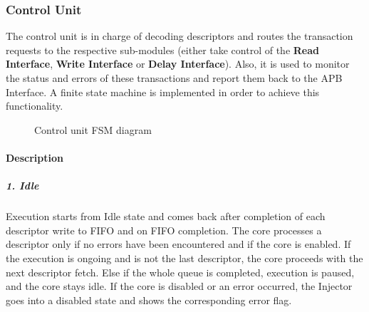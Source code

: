 \newpage
\subsubsection{Control Unit}
The control unit is in charge of decoding descriptors and routes the transaction requests to the respective sub-modules (either take control of the \textbf{Read Interface}, \textbf{Write Interface} or \textbf{Delay Interface}). Also, it is used to monitor the status and errors of these transactions and report them back to the APB Interface. 
A finite state machine is implemented in order to achieve this functionality.\\
\begin{figure}[ht]
	\centering
	\caption{Control unit FSM diagram}
	\label{fig:control_states}
\end{figure}

\paragraph{Description}
\subparagraph{1. Idle}
Execution starts from Idle state and comes back after completion of each descriptor write to FIFO and on FIFO completion. The core processes a descriptor only if no errors have been encountered and if the core is enabled. If the execution is ongoing and is not the last descriptor, the core proceeds with the next descriptor fetch. Else if the whole queue is completed, execution is paused, and the core stays idle. If the core is disabled or an error occurred, the Injector goes into a disabled state and shows the corresponding error flag.

